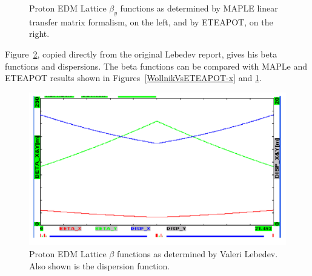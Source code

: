 \documentclass[12]{article}
\begin{document}
\begin{figure}[hbt]
\begin{minipage}{0.5\linewidth}
\end{minipage}
\caption{\label{WollnikVsETEAPOT-y}Proton EDM Lattice $\beta_y$ functions as determined by
MAPLE linear transfer matrix formalism, on the left, and by ETEAPOT, on the right.}
\end{figure}

Figure~\ref{fig:ValLeb2Twiss}, copied directly from the original Lebedev report,
gives his beta functions and dispersions. The beta functions can be compared 
with MAPLe and ETEAPOT results shown in
Figures~\ref{WollnikVsETEAPOT-x} and \ref{WollnikVsETEAPOT-y}.
%
\begin{figure}[hbt]
\centering
\includegraphics[scale=0.35]{pdf/ValLeb2-twiss.pdf}
\caption{\label{fig:ValLeb2Twiss}Proton EDM Lattice $\beta$ functions as determined by
Valeri Lebedev\cite{ValLeb2}. Also shown is the dispersion function.}
\end{figure}
\end{document}
